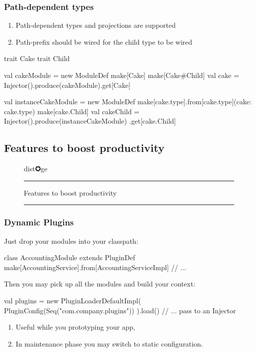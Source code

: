 \documentclass[usenames,dvipsnames]{beamer}
\begin{document}
\begin{frame}[fragile]
\frametitle{Path-dependent types}
\begin{enumerate}
\item Path-dependent types and projections are supported
\item Path-prefix should be wired for the child type to be wired
\end{enumerate}
\begin{scalacode}
trait Cake { trait Child }

val cakeModule = new ModuleDef {
  make[Cake]
  make[Cake#Child]
}
val cake = Injector().produce(cakeModule).get[Cake]

val instanceCakeModule = new ModuleDef {
  make[cake.type].from[cake.type](cake: cake.type)
  make[cake.Child]
}
val cakeChild = Injector().produce(instanceCakeModule)
  .get[cake.Child]
\end{scalacode}
\end{frame}

\subsection{Features to boost productivity}
\begin{frame}
\begin{figure}
\Huge 
\color{RubineRed} dist✪ge
\noindent
\rule{\linewidth}{1mm}
\Large Features to boost productivity
\rule{\linewidth}{1mm}
\end{figure}
\end{frame}

\begin{frame}[fragile]
\frametitle{Dynamic Plugins}
Just drop your modules into your classpath:
\begin{scalacode}
class AccountingModule extends PluginDef {
  make[AccountingService].from[AccountingServiceImpl]
  // ...
}
\end{scalacode}
Then you may pick up all the modules and build your context:
\begin{scalacode}
val plugins = new PluginLoaderDefaultImpl(
  PluginConfig(Seq("com.company.plugins"))
).load()
// ... pass to an Injector
\end{scalacode}
\begin{enumerate}
\item Useful while you prototyping your app,
\item In maintenance phase you may switch to static configuration.
\end{enumerate}
\end{frame}
\end{document}
